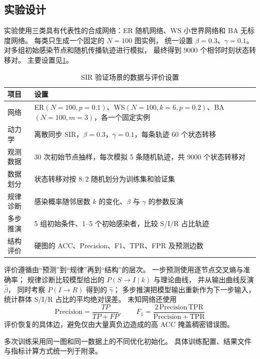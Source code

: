 \subsection{实验设计}

实验使用三类具有代表性的合成网络：ER 随机网络、WS 小世界网络和 BA 无标度网络。
每类只生成一个固定的 $N=100$ 图实例，
统一设置 $\beta=0.3$、$\gamma=0.1$。
对多组初始感染节点和随机传播轨迹进行模拟，
最终得到 9000 个相邻时刻状态转移对。
主要设置见\cref{tab:protocol}。

\begin{table}[H]
  \centering
  \caption{SIR 验证场景的数据与评价设置}
  \label{tab:protocol}
  \begin{tabularx}{0.96\textwidth}{@{}lX@{}}
    \toprule
    项目 & 设置 \\
    \midrule
    网络 & ER$(N=100,p=0.1)$、WS$(N=100,k=6,p=0.2)$、BA$(N=100,m=3)$，各一个固定实例 \\
    动力学 & 离散同步 SIR，$\beta=0.3$，$\gamma=0.1$，每条轨迹 60 个状态转移 \\
    观测数据 & 30 次初始节点抽样，每次模拟 5 条随机轨迹，共 9000 个状态转移对 \\
    数据划分 & 状态转移对按 $8:2$ 随机划分为训练集和验证集 \\
    规律诊断 & 感染概率随邻居数 $k$ 的变化、$\beta$ 与 $\gamma$ 的参数反演 \\
    多步推演 & 5 组初始条件、1--5 个初始感染者，比较 S/I/R 占比轨迹 \\
    结构评价 & 硬图的 ACC、Precision、F1、TPR、FPR 及预测边数 \\
    \bottomrule
  \end{tabularx}
\end{table}

评价遵循由“预测”到“规律”再到“结构”的层次。
一步预测使用逐节点交叉熵与准确率；
规律诊断比较模型给出的 $P(S\to I\mid k)$ 与理论曲线，
并从输出曲线反演 $\hat\beta$，
同时考察 $P(I\to R)$ 得到的 $\hat\gamma$；
多步推演把模型输出重新作为下一步输入，
统计群体 S/I/R 占比的平均绝对误差。
未知网络还使用
\begin{equation}
\mathrm{Precision}=\frac{TP}{TP+FP},\qquad
F_1=\frac{2\,\mathrm{Precision}\,\mathrm{TPR}}
{\mathrm{Precision}+\mathrm{TPR}}
\end{equation}
评价恢复的具体边，避免仅由大量真负边造成的高 ACC 掩盖稠密错误图。

多次训练采用同一图和同一数据上的不同优化初始化。
具体训练配置、结果文件与指标计算方式统一列于附录。
